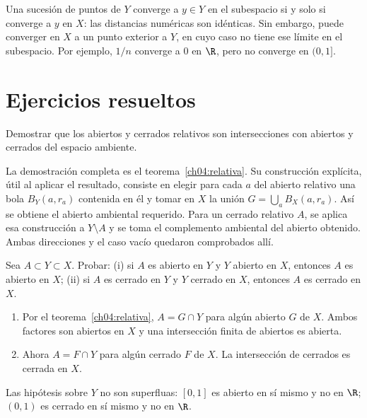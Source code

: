 \begin{observacion}\label{ch04:convergencia}
Una sucesión de puntos de $Y$ converge a $y\in Y$ en el subespacio si y solo si converge a $y$ en $X$: las distancias numéricas son idénticas. Sin embargo, puede converger en $X$ a un punto exterior a $Y$, en cuyo caso no tiene ese límite en el subespacio. Por ejemplo, $1/n$ converge a $0$ en $\R$, pero no converge en $(0,1]$.
\end{observacion}

\section{Ejercicios resueltos}
\begin{ejercicio}
Demostrar que los abiertos y cerrados relativos son intersecciones con abiertos y cerrados del espacio ambiente.
\end{ejercicio}
\begin{solucion}
La demostración completa es el teorema~\ref{ch04:relativa}. Su construcción explícita, útil al aplicar el resultado, consiste en elegir para cada $a$ del abierto relativo una bola $B_Y(a,r_a)$ contenida en él y tomar en $X$ la unión $G=\bigcup_aB_X(a,r_a)$. Así se obtiene el abierto ambiental requerido. Para un cerrado relativo $A$, se aplica esa construcción a $Y\setminus A$ y se toma el complemento ambiental del abierto obtenido. Ambas direcciones y el caso vacío quedaron comprobados allí.
\end{solucion}

\begin{ejercicio}
Sea $A\subset Y\subset X$. Probar: (i) si $A$ es abierto en $Y$ y $Y$ abierto en $X$, entonces $A$ es abierto en $X$; (ii) si $A$ es cerrado en $Y$ y $Y$ cerrado en $X$, entonces $A$ es cerrado en $X$.
\end{ejercicio}
\begin{solucion}
\begin{enumerate}[label=(\roman*)]
\item Por el teorema~\ref{ch04:relativa}, $A=G\cap Y$ para algún abierto $G$ de $X$. Ambos factores son abiertos en $X$ y una intersección finita de abiertos es abierta.
\item Ahora $A=F\cap Y$ para algún cerrado $F$ de $X$. La intersección de cerrados es cerrada en $X$.
\end{enumerate}
Las hipótesis sobre $Y$ no son superfluas: $[0,1]$ es abierto en sí mismo y no en $\R$; $(0,1)$ es cerrado en sí mismo y no en $\R$.
\end{solucion}

